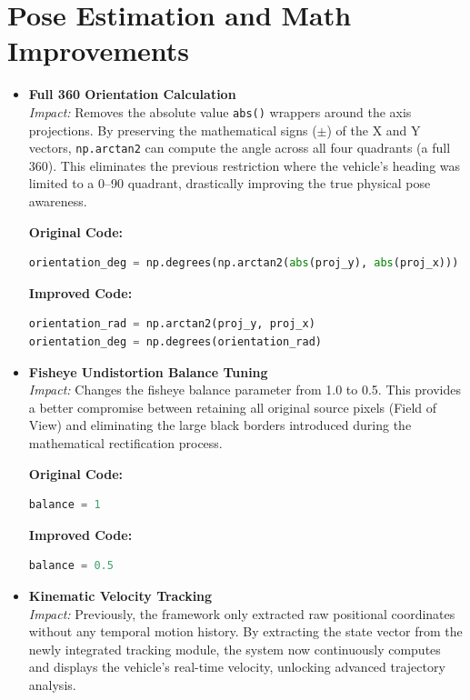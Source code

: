 \section{Pose Estimation and Math Improvements}

\begin{itemize}
    \item \textbf{Full 360\textdegree{} Orientation Calculation}\\
    \textit{Impact:} Removes the absolute value \texttt{abs()} wrappers around the axis projections. By preserving the mathematical signs (\(\pm\)) of the X and Y vectors, \texttt{np.arctan2} can compute the angle across all four quadrants (a full 360\textdegree{}). This eliminates the previous restriction where the vehicle's heading was limited to a 0--90\textdegree{} quadrant, drastically improving the true physical pose awareness.
    
    \textbf{Original Code:}
    \begin{lstlisting}[language=Python]
orientation_deg = np.degrees(np.arctan2(abs(proj_y), abs(proj_x)))
    \end{lstlisting}
    
    \textbf{Improved Code:}
    \begin{lstlisting}[language=Python]
orientation_rad = np.arctan2(proj_y, proj_x)
orientation_deg = np.degrees(orientation_rad)
    \end{lstlisting}

    \item \textbf{Fisheye Undistortion Balance Tuning}\\
    \textit{Impact:} Changes the fisheye balance parameter from 1.0 to 0.5. This provides a better compromise between retaining all original source pixels (Field of View) and eliminating the large black borders introduced during the mathematical rectification process.
    
    \textbf{Original Code:}
    \begin{lstlisting}[language=Python]
balance = 1
    \end{lstlisting}
    
    \textbf{Improved Code:}
    \begin{lstlisting}[language=Python]
balance = 0.5
    \end{lstlisting}

    \item \textbf{Kinematic Velocity Tracking}\\
    \textit{Impact:} Previously, the framework only extracted raw positional coordinates without any temporal motion history. By extracting the state vector from the newly integrated tracking module, the system now continuously computes and displays the vehicle's real-time velocity, unlocking advanced trajectory analysis.
    

\end{itemize}
